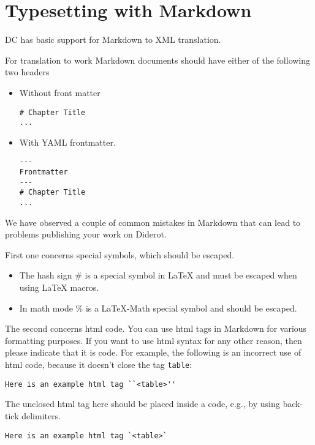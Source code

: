 \section{Typesetting with Markdown}

DC has basic support for Markdown to XML translation.  

\begin{gram}[Header]
For translation to work Markdown documents should have either of the following two headers
\begin{itemize}
\item Without front matter
\begin{lstlisting}
# Chapter Title
...
\end{lstlisting}  

\item  With YAML frontmatter.
\begin{lstlisting}
--- 
Frontmatter
---
# Chapter Title
...
\end{lstlisting}  
\end{itemize}
\end{gram}

\begin{important}
We have observed a couple of common mistakes in Markdown that can lead to problems publishing your work on Diderot.

First one concerns special symbols, which should be escaped.
\begin{itemize}
\item The hash sign \# is a special symbol in LaTeX and must be escaped when using LaTeX macros.
\item In math mode \% is a LaTeX-Math special symbol and should be escaped.
\end{itemize}

The second concerns html code.  You can use html tags in Markdown for various formatting purposes.  If you want to use html syntax for  any other reason, then please indicate that it is code.  For example, the following is an incorrect use of html code, because it doesn't close the tag \lstinline`table`:
\begin{lstlisting}
Here is an example html tag ``<table>''
\end{lstlisting}

The unclosed html tag here should be placed inside a code, e.g., by using back-tick delimiters. 
\begin{lstlisting}
Here is an example html tag `<table>`
\end{lstlisting}

\end{important}

